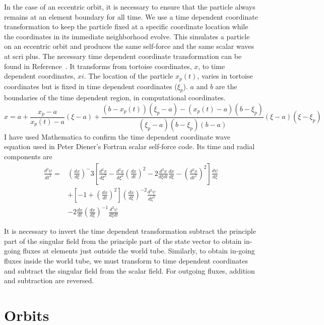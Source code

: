 In the case of an eccentric orbit, it is necessary to ensure that the particle always remains at an element boundary for all time. We use a time dependent coordinate transformation to keep the particle fixed at a specific coordinate location while the coordinates in its immediate neighborhood evolve. This simulates a particle on an eccentric orbit and produces the same self-force and the same scalar waves at scri plus. The necessary time dependent coordinate transformation can be found in Reference~\cite{time_dependent_coordinate_transformation}. It transforms from tortoise coordinates, $x$, to time dependent coordinates, $xi$. The location of the particle $x_p(t)$, varies in tortoise coordinates but is fixed in time dependent coordinates ($\xi_p$). $a$ and $b$ are the boundaries of the time dependent region, in computational coordinates. 
\begin{equation}
  x=a+\frac{x_p-a}{x_p(t)-a}(\xi-a)+\frac{(b-x_p(t))(\xi_p-a)-(x_p(t)-a)(b-\xi_p)}{(\xi_p-a)(b-\xi_p)(b-a)}(\xi-a)(\xi-\xi_p)
\end{equation}
I have used Mathematica to confirm the time dependent coordinate wave equation used in Peter Diener's Fortran scalar self-force code. Its time and radial components are
\begin{eqnarray}
\frac{d^2\psi}{dt^2}=&\left(\frac{dx}{d\xi}\right)^-3\left[\frac{d^2x}{d\xi^2}-\frac{d^2x}{d\xi^2}\left(\frac{dx}{dt}\right)^2-2\frac{d^2x}{d\xi dt}\frac{dx}{d\xi}-\left(\frac{d^2x}{dt^2}\right)^2\right]\frac{d\psi}{d\xi}\nonumber\\
&+\left[-1+\left(\frac{dx}{dt}\right)^2\right]\left(\frac{dx}{d\xi}\right)^{-2}\frac{d^2\psi}{d\xi^2}\nonumber\\
&-2\frac{dx}{dt}\left(\frac{dx}{d\xi}\right)^{-1}\frac{d^2\psi}{d\xi dt}
\end{eqnarray}

It is necessary to invert the time dependent transformation subtract the principle part of the singular field from the principle part of the state vector to obtain in-going fluxes at elements just outside the world tube. Similarly, to obtain in-going fluxes inside the world tube, we must transform to time dependent coordinates and subtract the singular field from the scalar field. For outgoing fluxes, addition and subtraction are reversed. 


\section{Orbits}

